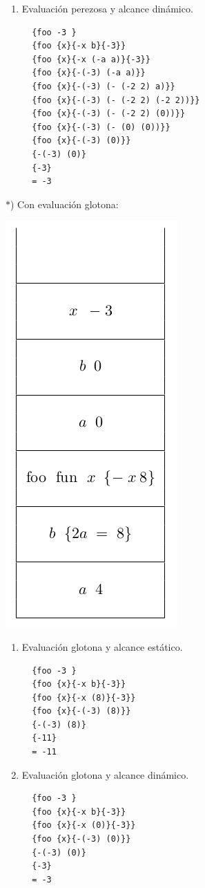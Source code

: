 \begin{multicols}{2}
\begin{enumerate}
\begin{lstlisting}
\end{lstlisting}
  \item Evaluación perezosa y alcance dinámico.
  \begin{lstlisting}
  {foo -3 }
  {foo {x}{-x b}{-3}}
  {foo {x}{-x (-a a)}{-3}}
  {foo {x}{-(-3) (-a a)}}
  {foo {x}{-(-3) (- (-2 2) a)}}
  {foo {x}{-(-3) (- (-2 2) (-2 2))}}
  {foo {x}{-(-3) (- (-2 2) (0))}}
  {foo {x}{-(-3) (- (0) (0))}}
  {foo {x}{-(-3) (0)}}
  {-(-3) (0)}
  {-3}
  = -3
  \end{lstlisting}
  \end{enumerate}

  \newpage
  $*$) Con evaluación glotona:
  \begin{center}
    \includegraphics[scale=0.55]{./Glotona}
  \end{center}

  \begin{enumerate}
  \item Evaluación glotona y alcance estático.
  \begin{lstlisting}
  {foo -3 }
  {foo {x}{-x b}{-3}}
  {foo {x}{-x (8)}{-3}}
  {foo {x}{-(-3) (8)}}
  {-(-3) (8)}
  {-11}
  = -11
\end{lstlisting}

  \item Evaluación glotona y alcance dinámico.
  \begin{lstlisting}
  {foo -3 }
  {foo {x}{-x b}{-3}}
  {foo {x}{-x (0)}{-3}}
  {foo {x}{-(-3) (0)}}
  {-(-3) (0)}
  {-3}
  = -3
\end{lstlisting}
  \end{enumerate}

\end{multicols}

